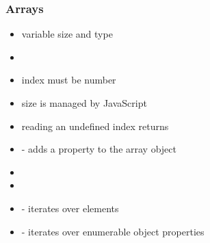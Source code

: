 \begin{frame}[fragile] \frametitle{Arrays}
\begin{itemize}
  \item variable size and type
  \item {}
  \item index must be number
  \item size is managed by JavaScript
  \item reading an undefined index returns 
  \item {} - adds a property to the array object
  \item {}
  \item {}
  \item {} - iterates over elements
  \item {} - iterates over enumerable object properties
\end{itemize}
\end{frame}